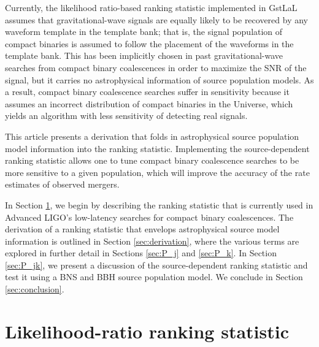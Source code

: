 \documentclass[twocolumn,showpacs,unsortedaddress,superscriptaddress,showkeys,nofootinbib,preprintnumbers,letterpaper]{revtex4-1}
\begin{document}
Currently, the likelihood ratio-based ranking statistic implemented in GstLaL assumes that gravitational-wave signals are equally likely to be recovered by any waveform template in the template bank; that is, the signal population of compact binaries is assumed to follow the placement of the waveforms in the template bank. This has been implicitly chosen in past gravitational-wave searches from compact binary coalescences in order to maximize the SNR of the signal, but it carries no astrophysical information of source population models. As a result, compact binary coalescence searches suffer in sensitivity because it assumes an incorrect distribution of compact binaries in the Universe, which yields an algorithm with less sensitivity of detecting real signals. 

This article presents a derivation that folds in astrophysical source population model information into the ranking statistic. Implementing the source-dependent ranking statistic allows one to tune compact binary coalescence searches to be more sensitive to a given population, which will improve the accuracy of the rate estimates of observed mergers. 

In Section \ref{sec:rankingstat}, we begin by describing the ranking statistic that is currently used in Advanced LIGO's low-latency searches for compact binary coalescences. The derivation of a ranking statistic that envelops astrophysical source model information is outlined in Section \ref{sec:derivation}, where the various terms are explored in further detail in Sections \ref{sec:P_j} and \ref{sec:P_k}. In Section \ref{sec:P_jk}, we present a discussion of the source-dependent ranking statistic and test it using a BNS and BBH source population model. We conclude in Section \ref{sec:conclusion}.


\section{Likelihood-ratio ranking statistic} \label{sec:rankingstat}
\end{document}
